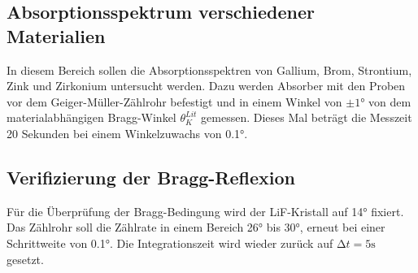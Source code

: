 \subsection{Absorptionsspektrum verschiedener Materialien}
In diesem Bereich sollen die Absorptionsspektren von Gallium, Brom, Strontium, 
Zink und Zirkonium untersucht werden. Dazu werden Absorber mit den Proben 
vor dem Geiger-Müller-Zählrohr befestigt und in einem Winkel von $\pm 1°$ von 
dem materialabhängigen Bragg-Winkel $\theta_K^{Lit}$ gemessen. Dieses Mal 
beträgt die Messzeit 20 Sekunden bei einem Winkelzuwachs von 0.1°.

\subsection{Verifizierung der Bragg-Reflexion}
Für die Überprüfung der Bragg-Bedingung wird der LiF-Kristall auf 14° fixiert.
Das Zählrohr soll die Zählrate in einem Bereich 26° bis 30°, erneut bei einer 
Schrittweite von 0.1°. Die Integrationszeit wird wieder zurück auf 
$\increment t = 5 \unit{\second}$ gesetzt.